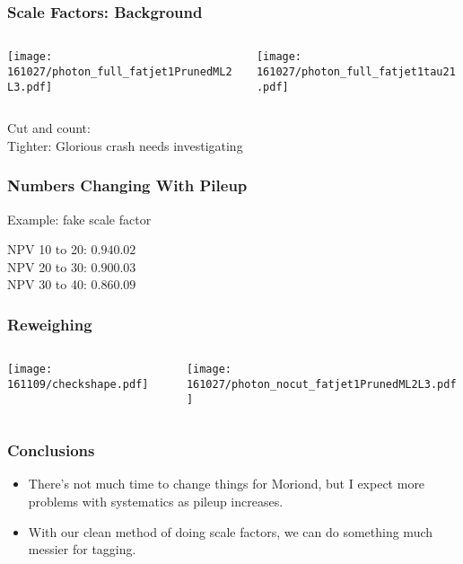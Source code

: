 \documentclass{beamer}
\begin{document}
\begin{frame}
  \frametitle{Scale Factors: Background}

  \begin{columns}
    \begin{column}{0.5\linewidth}
      \centering
      \texttt{[image: 161027/photon\_full\_fatjet1PrunedML2L3.pdf]}
    \end{column}
    \begin{column}{0.5\linewidth}
      \centering
      \texttt{[image: 161027/photon\_full\_fatjet1tau21.pdf]}
    \end{column}
  \end{columns}

  Cut and count:  \\
  Tighter: Glorious crash needs investigating

\end{frame}

\begin{frame}
  \frametitle{Numbers Changing With Pileup}

  Example: fake scale factor \\

  \vspace{24pt}
  \centering

  NPV 10 to 20: $0.94 $\pm$ 0.02$ \\
  NPV 20 to 30: $0.90 $\pm$ 0.03$ \\ 
  NPV 30 to 40: $0.86 $\pm$ 0.09$

\end{frame}

\begin{frame}
  \frametitle{Reweighing}

  \begin{columns}
    \begin{column}{0.5\linewidth}
      \centering
      \texttt{[image: 161109/checkshape.pdf]}
    \end{column}
    \begin{column}{0.5\linewidth}
      \centering
      \texttt{[image: 161027/photon\_nocut\_fatjet1PrunedML2L3.pdf]}
    \end{column}
  \end{columns}

\end{frame}

\begin{frame}
  \frametitle{Conclusions}

  \begin{itemize}
  \item There's not much time to change things for Moriond,
    but I expect more problems with systematics as pileup increases.
  \item With our clean method of doing scale factors,
    we can do something much messier for tagging.
  \end{itemize}

\end{frame}
\end{document}
